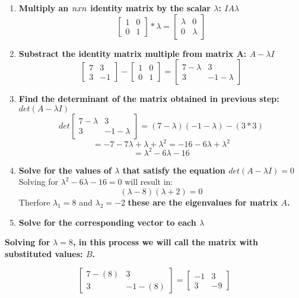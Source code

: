 \documentclass[]{book}
\begin{document}
\begin{enumerate}
\def\labelenumi{\arabic{enumi}.}
\item
  \textbf{Multiply an \(n\space x\space n\) identity matrix by the
  scalar \(\lambda\): \(IA\lambda\)} \[\left[ \begin{array}{cc}
  1 & 0 \\
  0 & 1  \end{array} \right] * \lambda = \left[ \begin{array}{cc}
  \lambda & 0 \\
  0 & \lambda  \end{array} \right]\]
\item
  \textbf{Substract the identity matrix multiple from matrix A:
  \(A-\lambda I\)} \[\left[ \begin{array}{cc}
  7 & 3 \\
  3 & -1  \end{array} \right] - \left[ \begin{array}{cc}
  1 & 0 \\
  0 & 1  \end{array} \right] = \left[ \begin{array}{cc}
  7-\lambda & 3 \\
  3 & -1-\lambda  \end{array} \right]\]
\item
  \textbf{Find the determinant of the matrix obtained in previous step:
  \(det(A-\lambda I)\)} \[ det\left[ \begin{array}{cc}
  7-\lambda & 3 \\
  3 & -1-\lambda  \end{array} \right] = (7-\lambda)(-1-\lambda)-(3*3)\]
  \[= - 7 - 7 \lambda + \lambda + \lambda^2 = -16-6\lambda + \lambda^2\]
  \[= \lambda^2 - 6\lambda -16\]
\item
  \textbf{Solve for the values of \(\lambda\) that satisfy the equation
  \(det(A-\lambda I)=0\)} Solving for \(\lambda^2 - 6\lambda -16 = 0\)
  will result in: \[(\lambda-8)(\lambda+2)=0\] Therfore
  \(\lambda_1 = 8\) and \(\lambda_2 = -2\) \textbf{these are the
  eigenvalues for matrix \(A\).} 
\item
  \textbf{Solve for the corresponding vector to each \(\lambda\)}
\end{enumerate}

\textbf{Solving for }\(\lambda = 8\)\textbf{, in this process we will
call the matrix with substituted values: \(B\).}

\[ \left[ \begin{array}{cc}
7-(8) & 3 \\
3 & -1-(8)  \end{array} \right] =  \left[ \begin{array}{cc}
-1 & 3 \\
3 & -9  \end{array} \right]\]
\end{document}
